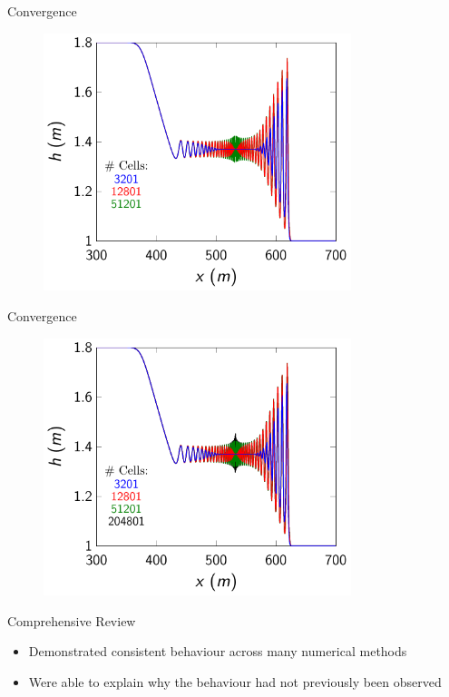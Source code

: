 \documentclass[]{beamer}
\begin{document}
\begin{frame}{Convergence}
		\begin{figure}
			\includegraphics[width=0.8\textwidth]{./Pics/SteepGradients/h012.pdf}
		\end{figure}
\end{frame}
\begin{frame}{Convergence}
		\begin{figure}
			\includegraphics[width=0.8\textwidth]{./Pics/SteepGradients/h0123.pdf}
		\end{figure}
\end{frame}


\begin{frame}{Comprehensive Review}
	\begin{itemize}
		\item Demonstrated consistent behaviour across many numerical methods
		\item Were able to explain why the behaviour had not previously been observed
	\end{itemize}
\end{frame}
\end{document}
